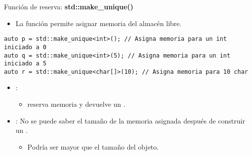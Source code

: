 \begin{frame}[t,fragile]{Función de reserva: \textbf{std::make\_unique()}}
\begin{itemize}
  \item La función  permite asignar memoria del 
        almacén libre.
\end{itemize}
\begin{lstlisting}
auto p = std::make_unique<int>(); // Asigna memoria para un int iniciado a 0
auto q = std::make_unique<int>(5); // Asigna memoria para un int iniciado a 5
auto r = std::make_unique<char[]>(10); // Asigna memoria para 10 char
\end{lstlisting}

\begin{itemize}
  \item {}:
    \begin{itemize}
      \item {} reserva memoria y devuelve 
            un .
    \end{itemize}

  \item {}: No se puede saber el tamaño de la memoria asignada 
        después de construir un .
    \begin{itemize}
      \item Podría ser mayor que el tamaño del objeto.
    \end{itemize}
\end{itemize}
\end{frame}
